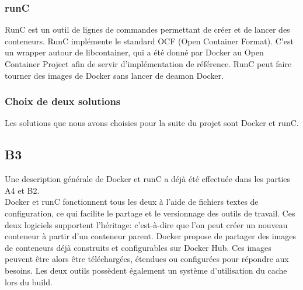     \subsubsection*{runC}
    RunC est un outil de lignes de commandes permettant de créer et de lancer des conteneurs. RunC implémente le standard OCF (Open Container Format). C'est un wrapper autour de libcontainer, qui a été donné par Docker au Open Container Project afin de servir d'implémentation de référence. RunC peut faire tourner des images de Docker sans lancer de deamon Docker.


    \subsubsection*{Choix de deux solutions}
    Les solutions que nous avons choisies pour la suite du projet sont Docker et runC.

\subsection*{B3}
    Une description générale de Docker et runC a déjà été effectuée dans les parties A4 et B2.\\

    Docker et runC fonctionnent tous les deux à l'aide de fichiers textes de configuration, ce qui facilite le partage et le versionnage des outils de travail. Ces deux logiciels supportent l'héritage: c'est-à-dire que l'on peut créer un nouveau conteneur à partir d'un conteneur parent. Docker propose de partager des images de conteneurs déjà construits et configurables sur Docker Hub. Ces images peuvent être alors être téléchargées, étendues ou configurées pour répondre aux besoins. Les deux outils possèdent également un système d'utilisation du cache lors du build.

